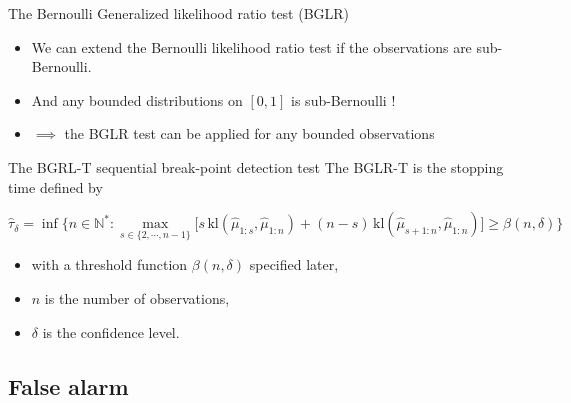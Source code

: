 \documentclass[11pt,french,ignorenonframetext,]{beamer}
\providecommand{\tightlist}{%
  \setlength{\itemsep}{0pt}\setlength{\parskip}{0pt}}
\begin{document}
\begin{frame}{The Bernoulli Generalized likelihood ratio test (BGLR)}

  \begin{itemize}
    \item
    We can extend the Bernoulli likelihood ratio test if the observations are \alert{sub-Bernoulli}.
    \item
    And any bounded distributions on $[0,1]$ is sub-Bernoulli !
    \item
    $\implies$ the BGLR test can be applied for any bounded observations \dCooley{}
  \end{itemize}


  \pause

  \begin{block}{The BGRL-T sequential break-point detection test}
    The \alert{BGLR-T} is the stopping time defined by
    \begin{small}
    \[ \widehat{\tau}_{\delta} = \inf \bigl\{ n \in \mathbb{N}^* : \max_{s \in \{2,\cdots,n-1\}} \bigl[s \, \mathrm{kl}\left(\widehat{\mu}_{1:s},\widehat{\mu}_{1:n}\right) + (n-s) \, \mathrm{kl}\left(\widehat{\mu}_{s+1:n},\widehat{\mu}_{1:n}\right)\bigr] \geq \beta(n,\delta) \bigr\} \]
    \vspace*{-10pt}
    \end{small}%
    \begin{itemize}\tightlist
      \item with a \alert{threshold function} $\beta(n,\delta)$ specified later,
      \item $n$ is the number of observations,
      \item $\delta$ is the confidence level.
    \end{itemize}%
  \end{block}

\end{frame}


\subsection{\hfill{}False alarm\hfill{}}
\end{document}
